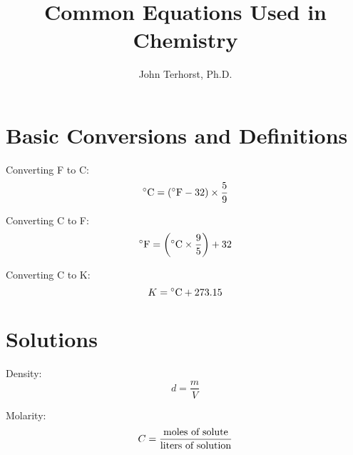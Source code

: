 \documentclass[10pt]{article}
\title{Common Equations Used in Chemistry}
\author{John Terhorst, Ph.D.}
\begin{document}

\maketitle
\tableofcontents


\newpage\section{Basic Conversions and Definitions}

Converting \deg F to \deg C:
\begin{equation*}
\textnormal{\deg C} = (\textnormal{\deg F}-32)\times \frac{5}{9}
\end{equation*}

Converting \deg C to \deg F:
\begin{equation*}
\textnormal{\deg F} = \left(\textnormal{\deg C}\times \frac{9}{5}\right) +32
\end{equation*}

Converting \deg C to K:
\begin{equation*}
K = \textnormal{\deg C}+273.15
\end{equation*}


\section{Solutions}

Density:
\begin{equation*}
d = \frac{m}{V}
\end{equation*}

Molarity:
\begin{equation*}
C = \frac{\textnormal{moles of solute}}{\textnormal{liters of solution}}
\end{equation*}
\end{document}
